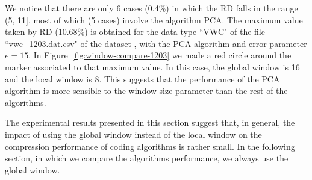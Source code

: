 We notice that there are only 6 cases (0.4\%) in which the RD falls in the range (5, 11], most of which (5 cases) involve the algorithm PCA. The maximum value taken by RD (10.68\%) is obtained for the data type ``VWC" of the file ``vwc\_1203.dat.csv" of the dataset \datasetsst, with the PCA algorithm and error parameter $e=15$. In Figure~\ref{fig:window-compare-1203} we made a red circle around the marker associated to that maximum value. In this case, the global window is 16 and the local window is 8. This suggests that the performance of the PCA algorithm is more sensible to the window size parameter than the rest of the algorithms.


The experimental results presented in this section suggest that, in general, the impact of using the global window instead of the local window on the compression performance of coding algorithms is rather small. In the following section, in which we compare the algorithms performance, we always use the global window.

